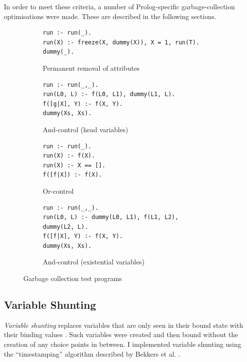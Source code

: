 In order to meet these criteria, a number of Prolog-specific garbage-collection optimisations were made. These are described in the following sections.

\begin{figure}[H]
\centering
\begin{subfigure}{\textwidth}
\centering
\begin{verbatim}
run :- run(_).
run(X) :- freeze(X, dummy(X)), X = 1, run(T).
dummy(_).
\end{verbatim}
\caption{Permanent removal of attributes}
\end{subfigure}
\par\bigskip
\par\bigskip
\begin{subfigure}{.65\textwidth}
\centering
\begin{verbatim}
run :- run(_,_).
run(L0, L) :- f(L0, L1), dummy(L1, L).
f([g|X], Y) :- f(X, Y).
dummy(Xs, Xs).
\end{verbatim}
\caption{And-control (head variables)}
\end{subfigure}%
\begin{subfigure}{.35\textwidth}
\centering
\begin{verbatim}
run :- run(_).
run(X) :- f(X).
run(X) :- X == [].
f([f|X]) :- f(X).
\end{verbatim}
\caption{Or-control}
\label{fig:or-control}
\end{subfigure}
\par\bigskip
\par\bigskip
\begin{subfigure}{\textwidth}
\centering
\begin{verbatim}
run :- run(_,_).
run(L0, L) :- dummy(L0, L1), f(L1, L2), dummy(L2, L).
f([f|X], Y) :- f(X, Y).
dummy(Xs, Xs).
\end{verbatim}
\caption{And-control (existential variables)}
\end{subfigure}
\caption{Garbage collection test programs}
\label{fig:gc-programs}
\end{figure}

\subsection{Variable Shunting}

\label{sec:variable-shunting}

\emph{Variable shunting} replaces variables that are only seen in their bound state with their binding values \cite{sahlinVariableShuntingWAM1991}. Such variables were created and then bound without the creation of any choice points in between. I implemented variable shunting using the ``timestamping'' algorithm described by Bekkers et al. \cite{bekkersDynamicMemoryManagement1992}.

